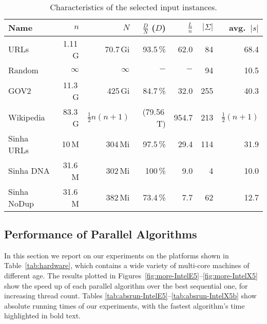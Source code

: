 \documentclass[a4paper]{myjournal}
\begin{document}
\begin{table}[tb]\centering\normalsize
\caption{Characteristics of the selected input instances.}\label{tab:data}
\def\tabcolsep{6pt}
\begin{tabular}{l|rrrrrr}
Name        & $n$      & $N$                       & $\frac{D}{N}$ ($D$) & $\frac{L}{n}$ & $|\Sigma|$ & avg.\ $|s|$             \\ \hline
URLs        & 1.11\,G  & 70.7\,Gi                  & 93.5\,\%            & 62.0          & 84         & 68.4                    \\
Random      & $\infty$ & $\infty$                  & $-$                 & $-$           & 94         & 10.5                    \\
GOV2        & 11.3\,G  & 425\,Gi                   & 84.7\,\%            & 32.0          & 255        & 40.3                    \\
Wikipedia   & 83.3\,G  & $\frac{1}{2} n (n\!+\!1)$ & (79.56\,T)          & 954.7         & 213        & $\frac{1}{2} (n\!+\!1)$ \\
Sinha URLs  & 10\,M    & 304\,Mi                   & 97.5\,\%            & 29.4          & 114        & 31.9                    \\
Sinha DNA   & 31.6\,M  & 302\,Mi                   & 100\,\%             & 9.0           & 4          & 10.0                    \\
Sinha NoDup & 31.6\,M  & 382\,Mi                   & 73.4\,\%            & 7.7           & 62         & 12.7                    \\
\end{tabular}
\end{table}

\subsection{Performance of Parallel Algorithms}\label{sec:exp-parallel}

In this section we report on our experiments on the platforms shown in
Table~\ref{tab:hardware}, which contains a wide variety of multi-core machines
of different age. The results plotted in
Figures~\ref{fig:more-IntelE5}--\ref{fig:more-IntelX5} show the speed up of each
parallel algorithm over the best sequential one, for increasing thread count.
Tables \ref{tab:absrun-IntelE5}--\ref{tab:absrun-IntelX5b} show absolute running
times of our experiments, with the fastest algorithm's time highlighted in bold
text.
\end{document}
